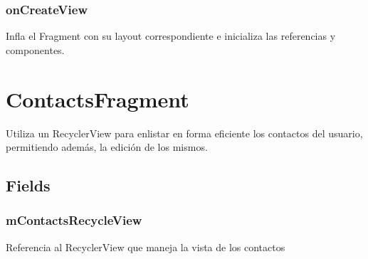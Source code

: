 \documentclass[letterpaper,10pt,english]{sphinxmanual}
\begin{document}
\subsubsection{onCreateView}
\label{Fragments/AddJobFragment:oncreateview}

\begin{fulllineitems}
\label{Fragments/AddJobFragment:com.fiuba.tallerii.jobify.AddJobFragment.onCreateView(LayoutInflater, ViewGroup, Bundle)}
Infla el Fragment con su layout correspondiente e inicializa las referencias y componentes.

\end{fulllineitems}



\section{ContactsFragment}
\label{Fragments/ContactsFragment::doc}\label{Fragments/ContactsFragment:contactsfragment}

\begin{fulllineitems}
\label{Fragments/ContactsFragment:com.fiuba.tallerii.jobify.ContactsFragment}
Utiliza un RecyclerView para enlistar en forma eficiente los contactos del usuario, permitiendo además, la edición de los mismos.

\end{fulllineitems}



\subsection{Fields}
\label{Fragments/ContactsFragment:fields}

\subsubsection{mContactsRecycleView}
\label{Fragments/ContactsFragment:mcontactsrecycleview}

\begin{fulllineitems}
\label{Fragments/ContactsFragment:com.fiuba.tallerii.jobify.ContactsFragment.mContactsRecycleView}
Referencia al RecyclerView que maneja la vista de los contactos

\end{fulllineitems}
\end{document}
